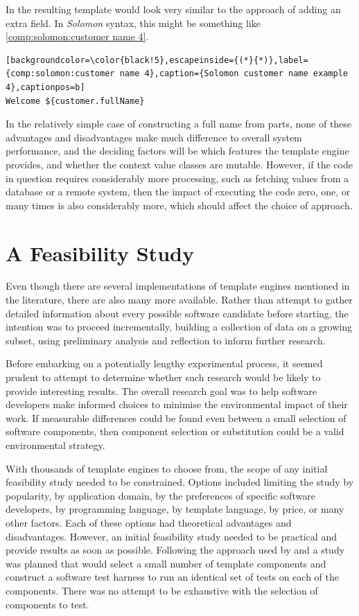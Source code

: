 In the resulting template would look very similar to the approach of adding an extra field. In \emph{Solomon} syntax, this might be something like \autoref{comp:solomon:customer name 4}.

\begin{lstlisting}[backgroundcolor=\color{black!5},escapeinside={(*}{*)},label={comp:solomon:customer name 4},caption={Solomon customer name example 4},captionpos=b]
Welcome ${customer.fullName}
\end{lstlisting}

In the relatively simple case of constructing a full name from parts, none of these advantages and disadvantages make much difference to overall system performance, and the deciding factors will be which features the \gls{template engine} provides, and whether the context value classes are mutable. However, if the code in question requires considerably more processing, such as fetching values from a database or a remote system, then the impact of executing the code zero, one, or many times is also considerably more, which should affect the choice of approach.

\section{A Feasibility Study}
\label{fs:methodology}
\label{section:fs1}

Even though there are several implementations of \gls{template engine}s mentioned in the literature, there are also many more available. Rather than attempt to gather detailed information about every possible software candidate before starting, the intention was to proceed incrementally, building a collection of data on a growing subset, using preliminary analysis and reflection to inform further research.

Before embarking on a potentially lengthy experimental process, it seemed prudent to attempt to determine whether such research would be likely to provide interesting results. The overall research goal was to help software developers make informed choices to minimise the environmental impact of their work. If measurable differences could be found even between a small selection of software components, then component selection or substitution could be a valid environmental strategy.

With thousands of \gls{template engine}s to choose from, the scope of any initial feasibility study needed to be constrained. Options included limiting the study by popularity, by application domain, by the preferences of specific software developers, by \gls{programming language}, by \gls{template language}, by price, or many other factors. Each of these options had theoretical advantages and disadvantages. However, an initial feasibility study needed to be practical and provide results as soon as possible. Following the approach used by \citet{Laakso2008} and \citet{Zoio2005} a study was planned that would select a small number of template components and construct a software test harness to run an identical set of tests on each of the components. There was no attempt to be exhaustive with the selection of components to test.

